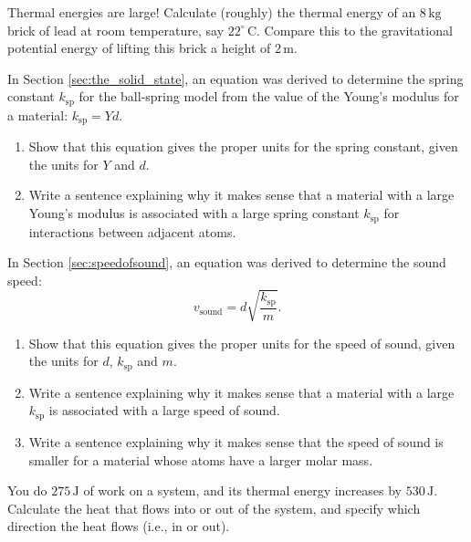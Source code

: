 \begin{exercise}
Thermal energies are large!  Calculate (roughly) the thermal energy of an
$8\,\text{kg}$ brick of lead at room temperature, say
$22^\circ\,\text{C}$.  Compare this to the gravitational potential
energy of lifting this brick a height of $2\,\text{m}$.
\label{problem:thermal_energies_large}
\end{exercise}

\begin{exercise}
In Section \ref{sec:the_solid_state}, an equation was derived to
determine the spring constant $k_\text{sp}$ for the ball-spring model from
the value of the Young's modulus for a material:  $k_\text{sp} = Yd$.
\begin{enumerate}
\item Show that this equation gives the proper units for the spring
constant, given the units for $Y$ and $d$.
\item Write a sentence explaining why it makes sense that a material
with a large Young's modulus is associated with a large spring constant
$k_\text{sp}$ for interactions between adjacent atoms.
\end{enumerate}
\end{exercise}

\begin{exercise}
In Section \ref{sec:speedofsound}, an equation was derived to
determine the sound speed:
\begin{equation*}
v_\text{sound} =  d\sqrt{\frac{k_\text{sp}}{m}}.
\end{equation*}
\begin{enumerate}
\item Show that this equation gives the proper units for the speed
of sound, given the units for $d$, $k_\text{sp}$ and $m$.
\item Write a sentence explaining why it makes sense that a material
with a large $k_\text{sp}$ is associated with a large speed of sound.
\item Write a sentence explaining why it makes sense that
the speed of sound is smaller for a material whose atoms have a 
larger molar mass. 
\end{enumerate}
\end{exercise}

\begin{exercise}
You do $275\,\text{J}$ of work on a system, and its thermal energy 
increases by $530\,\text{J}$.  Calculate the heat that flows into 
or out of the system, and specify which direction the heat flows 
(i.e., in or out).
\end{exercise}

